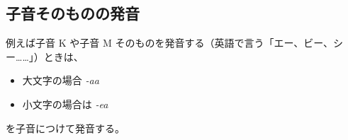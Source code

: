 \subsection{子音そのものの発音}

例えば子音 K や子音 M そのものを発音する（英語で言う「エー、ビー、シー……」）ときは、
\begin{itemize}
    \item 大文字の場合 \emph{-aa}
    \item 小文字の場合は \emph{-ea}
\end{itemize}
を子音につけて発音する。